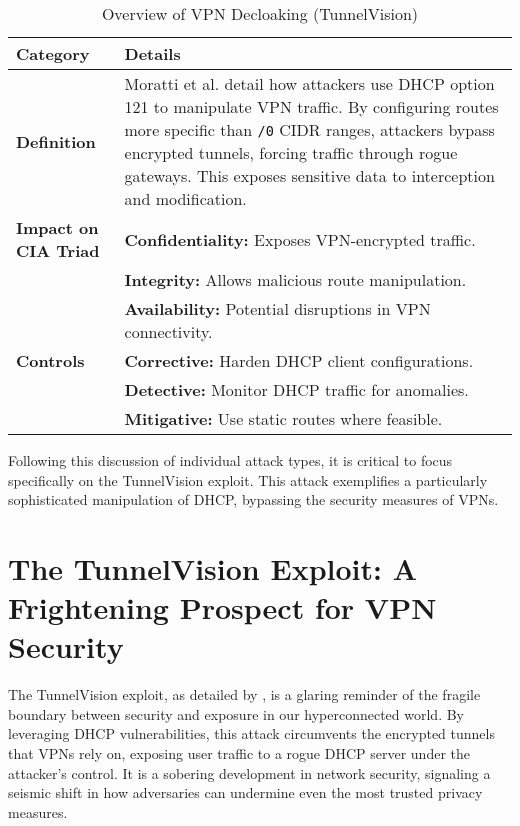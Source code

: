 \documentclass[conference]{IEEEtran}
\begin{document}
        \begin{table*}[h!]
            \centering
            \caption{Overview of VPN Decloaking (TunnelVision)}
            \label{tab:VPN_Decloaking}
            \begin{tabular}{@{}>{\raggedright}p{3cm} p{10cm}@{}}
                \toprule
                \textbf{Category} & \textbf{Details} \\ 
                \midrule
                \textbf{Definition} & Moratti et al. \cite{Moratti2024} detail how attackers use DHCP option 121 to manipulate VPN traffic. By configuring routes more specific than \texttt{/0} CIDR ranges, attackers bypass encrypted tunnels, forcing traffic through rogue gateways. This exposes sensitive data to interception and modification. \\ 
                \midrule
                \textbf{Impact on CIA Triad} & 
                \textbf{Confidentiality:} Exposes VPN-encrypted traffic. \\
                & \textbf{Integrity:} Allows malicious route manipulation. \\
                & \textbf{Availability:} Potential disruptions in VPN connectivity. \\ 
                \midrule
                \textbf{Controls} & 
                \textbf{Corrective:} Harden DHCP client configurations. \\
                & \textbf{Detective:} Monitor DHCP traffic for anomalies. \\
                & \textbf{Mitigative:} Use static routes where feasible. \\ 
                \bottomrule
            \end{tabular}
        \end{table*}

    Following this discussion of individual attack types, it is critical to focus specifically on the TunnelVision exploit. This attack exemplifies a particularly sophisticated manipulation of DHCP, bypassing the security measures of VPNs.

\section{The TunnelVision Exploit: A Frightening Prospect for VPN Security}
\label{sec:The_TunnelVision_Exploit}

    The TunnelVision exploit, as detailed by \cite{Moratti2024}, is a glaring reminder of the fragile boundary between security and exposure in our hyperconnected world. By leveraging DHCP vulnerabilities, this attack circumvents the encrypted tunnels that VPNs rely on, exposing user traffic to a rogue DHCP server under the attacker’s control. It is a sobering development in network security, signaling a seismic shift in how adversaries can undermine even the most trusted privacy measures.  
\end{document}
